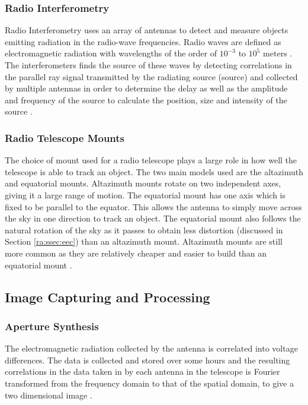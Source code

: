 \subsubsection{Radio Interferometry}\label{ra:ssec:des}
Radio Interferometry uses an array of antennas to detect and measure objects emitting radiation in the radio-wave frequencies. Radio waves are defined as electromagnetic radiation with wavelengths of the order of $10^{-3}$ to $10^5$ meters \citep{cheng2009radio}. The interferometers finds the source of these waves by detecting correlations in the parallel ray signal transmitted by the radiating source (source) and collected by multiple antennas in order to determine the delay as well as the amplitude and frequency of the source to calculate the position, size and intensity of the source \citep{thompson2008interferometry}.
%
\subsubsection{Radio Telescope Mounts}\label{ra:ssec:mount}
The choice of mount used for a radio telescope plays a large role in how well the telescope is able to track an object. The two main models used are the altazimuth and equatorial mounts. Altazimuth mounts rotate on two independent axes, giving it a large range of motion. The equatorial mount has one axis which is fixed to be parallel to the equator. This allows the antenna to simply move across the sky in one direction to track an object. The equatorial mount also follows the natural rotation of the sky as it passes to obtain less distortion (discussed in Section \ref{ra:ssec:eec}) than an altazimuth mount. Altazimuth mounts are still more common as they are relatively cheaper and easier to build than an equatorial mount \citep{thompson2008interferometry}.
%
\subsection{Image Capturing and Processing}\label{ra:sec:ic}
%
\subsubsection{Aperture Synthesis}\label{ra:ssec:rii}
The electromagnetic radiation collected by the antenna is correlated into voltage differences. The data is collected and stored over some hours and the resulting correlations in the data taken in by each antenna in the telescope is Fourier transformed from the frequency domain to that of the spatial domain, to give a two dimensional image \citep{sault1994multi}.
%
